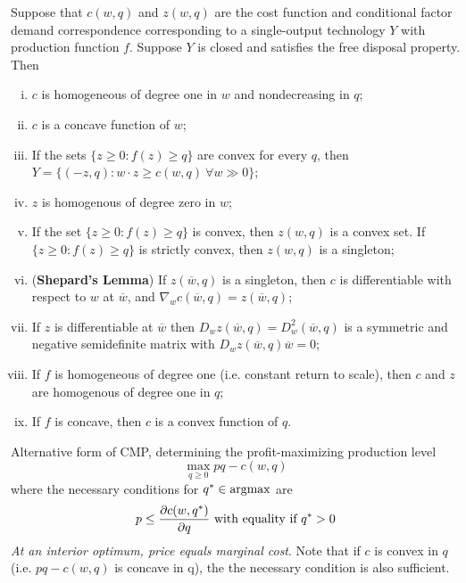 \documentclass{article}
\begin{document}
	 		\begin{proposition}[5.C.2]
	 			Suppose that $c(w, q)$ and $z(w, q)$ are the cost function and conditional factor demand correspondence corresponding to a single-output technology $Y$ with production function $f$. Suppose $Y$ is closed and satisfies the free disposal property. Then
	 			\begin{enumerate}[(i)]
	 				\item $c$ is homogeneous of degree one in $w$ and nondecreasing in $q$;
	 				\item $c$ is a concave function of $w$;
	 				\item If the sets $\{z\geq0:f(z)\geq q\}$ are convex for every $q$, then $Y=\{(-z, q): w \cdot z \geq c(w, q)\ \forall w \gg 0\}$;
	 				\item $z$ is homogenous of degree zero in $w$;
	 				\item If the set $\{z \geq 0: f(z) \geq q\}$ is convex, then $z(w, q)$ is a convex set. If $\{z \geq 0: f(z) \geq q\}$ is strictly convex, then $z(w, q)$ is a singleton;
	 				\item (\textbf{Shepard's Lemma}) If $z(\overline{w}, q)$ is a singleton, then $c$ is differentiable with respect to $w$ at $\overline{w}$, and $\nabla_w c(\overline{w}, q) = z(\overline{w}, q)$;
	 				\item If $z$ is differentiable at $\overline{w}$ then $D_w z (\overline{w}, q) = D^2_w (\overline{w}, q)$ is a symmetric and negative semidefinite matrix with $D_w z (\overline{w}, q) \overline{w} = 0$;
	 				\item If $f$ is homogeneous of degree one (i.e. constant return to scale), then $c$ and $z$ are homogenous of degree one in $q$;
	 				\item If $f$ is concave, then $c$ is a convex function of $q$.
	 			\end{enumerate}
	 		\end{proposition}
	 		
	 		\begin{corollary}
	 			Alternative form of CMP, determining the profit-maximizing production level
	 			\begin{equation}
	 				\max_{q \geq 0} p q - c(w, q)
	 			\end{equation}
	 			where the necessary conditions for $q^* \in \operatorname*{argmax}$ are
	 			\begin{equation}
	 				p \leq \frac{\partial{c(w, q^*)}}{\partial{q}}\text{{ with equality if }} q^* > 0
	 			\end{equation}
	 			\emph{At an interior optimum, price equals marginal cost}. Note that if $c$ is convex in $q$ (i.e. $p q - c(w, q)$ is concave in q), the the necessary condition is also sufficient.
	 		\end{corollary}
	 
\end{document}

